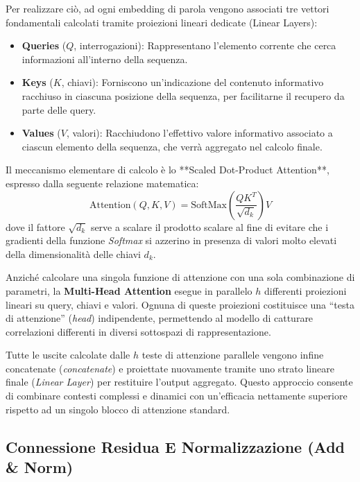 ﻿\documentclass[11pt, a4paper]{article}
\begin{document}
Per realizzare ciò, ad ogni embedding di parola vengono associati tre vettori fondamentali calcolati tramite proiezioni lineari dedicate (Linear Layers):
\begin{itemize}
    \item \textbf{Queries} ($Q$, interrogazioni): Rappresentano l'elemento corrente che cerca informazioni all'interno della sequenza.
    \item \textbf{Keys} ($K$, chiavi): Forniscono un'indicazione del contenuto informativo racchiuso in ciascuna posizione della sequenza, per facilitarne il recupero da parte delle query.
    \item \textbf{Values} ($V$, valori): Racchiudono l'effettivo valore informativo associato a ciascun elemento della sequenza, che verrà aggregato nel calcolo finale.
\end{itemize}

Il meccanismo elementare di calcolo è lo **Scaled Dot-Product Attention**, espresso dalla seguente relazione matematica:
\[
\text{Attention}(Q, K, V) = \text{SoftMax}\left(\frac{Q K^T}{\sqrt{d_k}}\right)V
\]
dove il fattore $\sqrt{d_k}$ serve a scalare il prodotto scalare al fine di evitare che i gradienti della funzione \emph{Softmax} si azzerino in presenza di valori molto elevati della dimensionalità delle chiavi $d_k$.


Anziché calcolare una singola funzione di attenzione con una sola combinazione di parametri, la \textbf{Multi-Head Attention} esegue in parallelo $h$ differenti proiezioni lineari su query, chiavi e valori. Ognuna di queste proiezioni costituisce una ``testa di attenzione'' (\emph{head}) indipendente, permettendo al modello di catturare correlazioni differenti in diversi sottospazi di rappresentazione.

Tutte le uscite calcolate dalle $h$ teste di attenzione parallele vengono infine concatenate (\emph{concatenate}) e proiettate nuovamente tramite uno strato lineare finale (\emph{Linear Layer}) per restituire l'output aggregato. Questo approccio consente di combinare contesti complessi e dinamici con un'efficacia nettamente superiore rispetto ad un singolo blocco di attenzione standard.

\subsection{Connessione Residua E Normalizzazione (Add \& Norm)}
\end{document}
